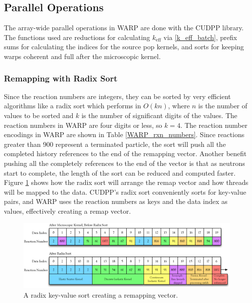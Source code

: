 \subsection{Parallel Operations}

The array-wide parallel operations in WARP are done with the CUDPP library.  The functions used are reductions for calculating $k_\mathrm{eff}$ via \eqref{k_eff_batch}, prefix sums for calculating the indices for the source pop kernels, and sorts for keeping warps coherent and full after the microscopic kernel.

\subsubsection{Remapping with Radix Sort}

Since the reaction numbers are integers, they can be sorted by very efficient algorithms like a radix sort which performs in $O(kn)$, where $n$ is the number of values to be sorted and $k$ is the number of significant digits of the values.  The reaction numbers in WARP are four digits or less, so $k=4$.  The reaction number encodings in WARP are shown in Table \ref{WARP_rxn_numbers}.  Since reactions greater than 900 represent a terminated particle, the sort will push all the completed history references to the end of the remapping vector.  Another benefit pushing all the completely references to the end of the vector is that as neutrons start to complete, the length of the sort can be reduced and computed faster.  Figure \ref{radix_sort} shows how the radix sort will arrange the remap vector and how threads will be mapped to the data.  CUDPP's radix sort conveniently sorts for key-value pairs, and WARP uses the reaction numbers as keys and the data index as values, effectively creating a remap vector.

\begin{figure}[h!] 
\centering
\includegraphics[width=1.0\textwidth]{graphics/radix_horiz.eps}
\caption{A radix key-value sort creating a remapping vector. \label{radix_sort} }
\end{figure}

